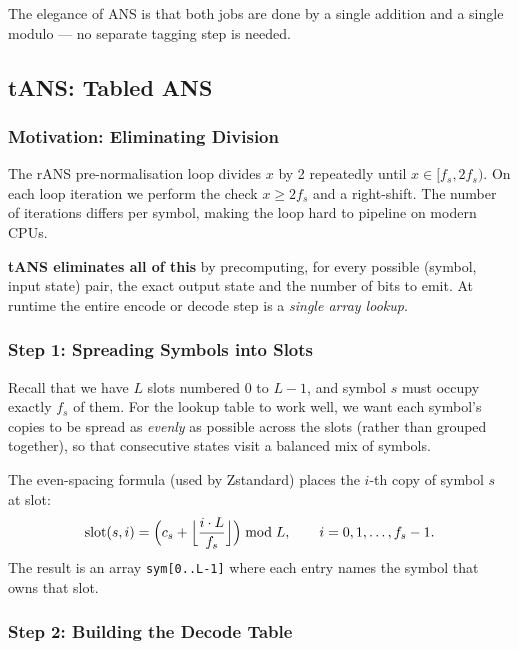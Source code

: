 The elegance of ANS is that both jobs are done by a single
addition and a single modulo — no separate tagging step is
needed.

\subsection{tANS: Tabled ANS}
\label{sec:tans}

\subsubsection{Motivation: Eliminating Division}

The rANS pre-normalisation loop divides $x$ by 2 repeatedly
until $x \in [f_s, 2f_s)$.  On each loop iteration we
perform the check $x \ge 2f_s$ and a right-shift.  The
number of iterations differs per symbol, making the loop
hard to pipeline on modern CPUs.

\textbf{tANS eliminates all of this} by precomputing, for
every possible (symbol, input state) pair, the exact output
state and the number of bits to emit.  At runtime the entire
encode or decode step is a \emph{single array lookup}.

\subsubsection{Step 1: Spreading Symbols into Slots}
\label{sec:ans_spread}

Recall that we have $L$ slots numbered $0$ to $L-1$, and
symbol $s$ must occupy exactly $f_s$ of them.  For the
lookup table to work well, we want each symbol's copies to
be spread as \emph{evenly} as possible across the slots
(rather than grouped together), so that consecutive states
visit a balanced mix of symbols.

The even-spacing formula (used by Zstandard) places the
$i$-th copy of symbol $s$ at slot:
\[
  \text{slot}(s, i) =
  \Bigl( c_s + \Bigl\lfloor \frac{i \cdot L}{f_s} \Bigr\rfloor
  \Bigr) \bmod L,
  \qquad i = 0, 1, \ldots, f_s - 1.
\]
The result is an array \texttt{sym[0..L-1]} where each entry
names the symbol that owns that slot.

\subsubsection{Step 2: Building the Decode Table}

